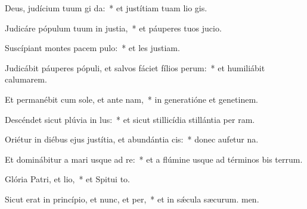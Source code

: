 \item Deus, judícium tuum gi da:~* et justítiam tuam lio gis.
\item Judicáre pópulum tuum in justia,~* et páuperes tuos  jucio.
\item Suscípiant montes pacem pulo:~* et les justiam.
\item Judicábit páuperes pópuli, et salvos fáciet fílios perum:~* et humiliábit calumarem.
\item Et permanébit cum sole, et ante nam,~* in generatióne et genetinem.
\item Descéndet sicut plúvia in lus:~* et sicut stillicídia stillántia per ram.
\item Oriétur in diébus ejus justítia, et abundántia cis:~* donec aufetur na.
\item Et dominábitur a mari usque ad re:~* et a flúmine usque ad términos bis terrum.
\item Glória Patri, et lio,~* et Spitui to.
\item Sicut erat in princípio, et nunc, et per,~* et in sǽcula sæcurum. men.
